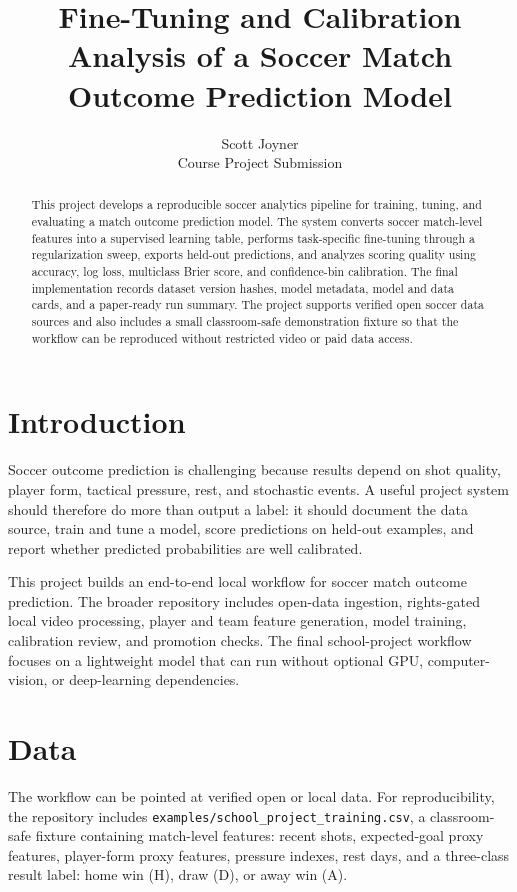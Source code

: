 \documentclass[11pt]{article}
\title{Fine-Tuning and Calibration Analysis of a Soccer Match Outcome Prediction Model}
\author{Scott Joyner\\Course Project Submission}
\date{}
\begin{document}
\maketitle

\begin{abstract}
This project develops a reproducible soccer analytics pipeline for training, tuning, and evaluating a match outcome prediction model. The system converts soccer match-level features into a supervised learning table, performs task-specific fine-tuning through a regularization sweep, exports held-out predictions, and analyzes scoring quality using accuracy, log loss, multiclass Brier score, and confidence-bin calibration. The final implementation records dataset version hashes, model metadata, model and data cards, and a paper-ready run summary. The project supports verified open soccer data sources and also includes a small classroom-safe demonstration fixture so that the workflow can be reproduced without restricted video or paid data access.
\end{abstract}

\section{Introduction}
Soccer outcome prediction is challenging because results depend on shot quality, player form, tactical pressure, rest, and stochastic events. A useful project system should therefore do more than output a label: it should document the data source, train and tune a model, score predictions on held-out examples, and report whether predicted probabilities are well calibrated.

This project builds an end-to-end local workflow for soccer match outcome prediction. The broader repository includes open-data ingestion, rights-gated local video processing, player and team feature generation, model training, calibration review, and promotion checks. The final school-project workflow focuses on a lightweight model that can run without optional GPU, computer-vision, or deep-learning dependencies.

\section{Data}
The workflow can be pointed at verified open or local data. For reproducibility, the repository includes \texttt{examples/school\_project\_training.csv}, a classroom-safe fixture containing match-level features: recent shots, expected-goal proxy features, player-form proxy features, pressure indexes, rest days, and a three-class result label: home win (H), draw (D), or away win (A).
\end{document}
